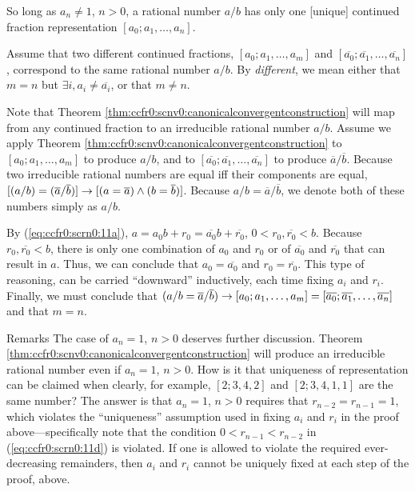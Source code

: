 \begin{vworklemmastatement}
\label{lem:ccfr0:scrn0:cfrepresentationisunique}
So long as $a_n \neq 1$, $n>0$, a rational number $a/b$ has only
one [unique] continued fraction representation
$[a_0; a_1, \ldots{} , a_n]$.
\end{vworklemmastatement}
\begin{vworklemmaproof}
Assume that two different continued fractions,
$[a_0; a_1, \ldots{} , a_m]$ and
$[\overline{a_0}; \overline{a_1}, \ldots{} , \overline{a_n}]$, 
correspond to the same rational number $a/b$.  By
\emph{different}, we mean either that $m=n$ but
$\exists i, a_i \neq \overline{a_i}$, or that $m \neq n$.

Note that Theorem \ref{thm:ccfr0:scnv0:canonicalconvergentconstruction}
will map from any continued fraction to an irreducible rational
number $a/b$.  Assume we apply 
Theorem \ref{thm:ccfr0:scnv0:canonicalconvergentconstruction} to
$[a_0; a_1, \ldots{} , a_m]$ to produce $a/b$, and 
to $[\overline{a_0}; \overline{a_1}, \ldots{} , \overline{a_n}]$
to produce $\overline{a}/\overline{b}$.  Because two irreducible
rational numbers are equal iff their components are 
equal, 
$[(a/b) = (\overline{a}/\overline{b})] \vworkhimp{} %
[(a = \overline{a}) \wedge (b = \overline{b})]$.  Because
$a/b = \overline{a}/\overline{b}$, we denote both of these
numbers simply as $a/b$.

By (\ref{eq:ccfr0:scrn0:11a}), 
$a = a_0 b + r_0 = \overline{a_0} b + \overline{r_0}$,
$0 < r_0, \overline{r_0} < b$.  Because 
$r_0, \overline{r_0} < b$, there is only one combination
of $a_0$ and $r_0$ or of $\overline{a_0}$ and
$\overline{r_0}$ that can result in $a$.  Thus, we can conclude
that $a_0 = \overline{a_0}$ and 
$r_0 = \overline{r_0}$.  This type of reasoning, can be 
carried ``downward'' inductively, each time fixing 
$a_{i}$ and $r_{i}$.  Finally, we must conclude
that $(a/b = \overline{a}/\overline{b}) \vworkhimp %
[a_0; a_1, \ldots{} , a_m] = %
[\overline{a_0}; \overline{a_1}, \ldots{} , \overline{a_n}]$ 
and that $m=n$.  
\end{vworklemmaproof}
\begin{vworklemmaparsection}{Remarks}
The case of $a_n=1$, $n>0$ deserves further discussion.
Theorem \ref{thm:ccfr0:scnv0:canonicalconvergentconstruction} will produce
an irreducible rational number even if 
$a_n = 1$, $n>0$.  How is it that uniqueness of representation can
be claimed when clearly, for example, $[2;3,4,2]$ and $[2;3,4,1,1]$
are the same number?  The answer is that $a_n = 1$, $n>0$ requires
that $r_{n-2}=r_{n-1}=1$, which violates the ``uniqueness'' assumption
used in fixing $a_i$ and $r_i$ in the proof above---specifically note
that the condition $0<r_{n-1}<r_{n-2}$ in (\ref{eq:ccfr0:scrn0:11d})
is violated.  If one is allowed to violate the required
ever-decreasing remainders, then $a_i$ and $r_i$ cannot
be uniquely fixed at each step of the proof, above.
\end{vworklemmaparsection}
\vworklemmafooter{}

